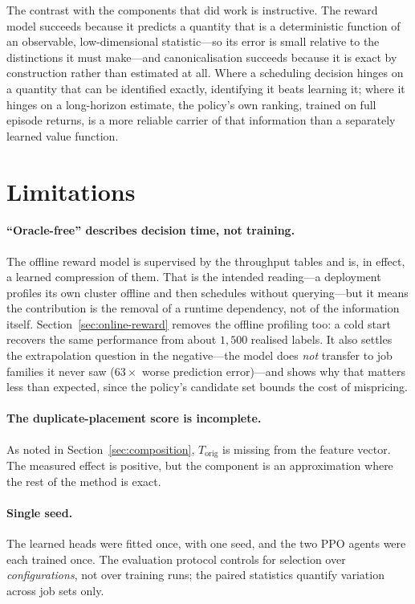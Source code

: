 \documentclass{article}
\begin{document}
The contrast with the components that did work is instructive. The reward model
succeeds because it predicts a quantity that is a deterministic function of an
observable, low-dimensional statistic---so its error is small relative to the
distinctions it must make---and canonicalisation succeeds because it is exact by
construction rather than estimated at all. Where a scheduling decision hinges on a
quantity that can be identified exactly, identifying it beats learning it; where it
hinges on a long-horizon estimate, the policy's own ranking, trained on full
episode returns, is a more reliable carrier of that information than a separately
learned value function.

\section{Limitations}
\label{sec:limitations}

\paragraph{``Oracle-free'' describes decision time, not training.}
\label{sec:limitations-profiling}
The offline reward model is supervised by the throughput tables and is, in effect,
a learned compression of them. That is the intended reading---a deployment profiles
its own cluster offline and then schedules without querying---but it means the
contribution is the removal of a runtime dependency, not of the information
itself. Section~\ref{sec:online-reward} removes the offline profiling too: a cold
start recovers the same performance from about $1{,}500$ realised labels. It also
settles the extrapolation question in the negative---the model does \emph{not}
transfer to job families it never saw ($63\times$ worse prediction error)---and
shows why that matters less than expected, since the policy's candidate set bounds
the cost of mispricing.

\paragraph{The duplicate-placement score is incomplete.}
As noted in Section~\ref{sec:composition}, $T_{\text{orig}}$ is missing from the
feature vector. The measured effect is positive, but the component is an
approximation where the rest of the method is exact.

\paragraph{Single seed.}
The learned heads were fitted once, with one seed, and the two PPO agents were
each trained once. The evaluation protocol controls for selection over
\emph{configurations}, not over training runs; the paired statistics quantify
variation across job sets only.
\end{document}
